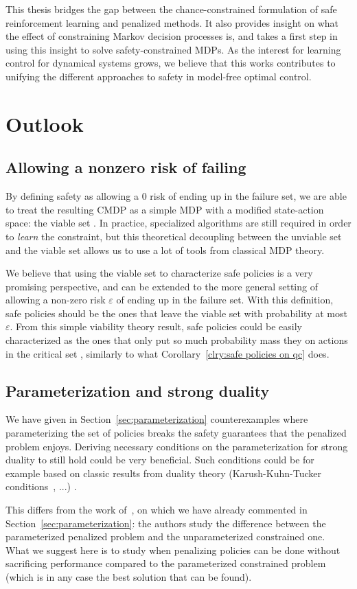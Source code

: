 This thesis bridges the gap between the chance-constrained formulation of safe reinforcement learning and penalized methods. It also provides insight on what the effect of constraining Markov decision processes is, and takes a first step in using this insight to solve safety-constrained MDPs. As the interest for learning control for dynamical systems grows, we believe that this works contributes to unifying the different approaches to safety in model-free optimal control.

\section{Outlook}

\subsection{Allowing a nonzero risk of failing} \label{sec:future nonzero}
By defining safety as allowing a $0$ risk of ending up in the failure set, we are able to treat the resulting CMDP as a simple MDP with a modified state-action space: the viable set \QV. In practice, specialized algorithms are still required in order to\emph{ learn} the constraint, but this theoretical decoupling between the unviable set and the viable set allows us to use a lot of tools from classical MDP theory.\par
We believe that using the viable set to characterize safe policies is a very promising perspective, and can be extended to the more general setting of allowing a non-zero risk $\varepsilon$ of ending up in the failure set. With this definition, safe policies should be the ones that leave the viable set with probability at most $\varepsilon$. From this simple viability theory result, safe policies could be easily characterized as the ones that only put so much probability mass they on actions in the critical set \QC, similarly to what Corollary~\ref{clry:safe policies on qc} does.
\subsection{Parameterization and strong duality}
We have given in Section~\ref{sec:parameterization} counterexamples where parameterizing the set of policies breaks the safety guarantees that the penalized problem enjoys. Deriving necessary conditions on the parameterization for strong duality to still hold could be very beneficial. Such conditions could be for example based on classic results from duality theory (Karush-Kuhn-Tucker conditions~\cite{boyd2004convex}, ...) .\par
This differs from the work of~\textcite{paternain2019safe}, on which we have already commented in Section~\ref{sec:parameterization}: the authors study the difference between the parameterized penalized problem and the unparameterized constrained one. What we suggest here is to study when penalizing policies can be done without sacrificing performance compared to the parameterized constrained problem (which is in any case the best solution that can be found).

